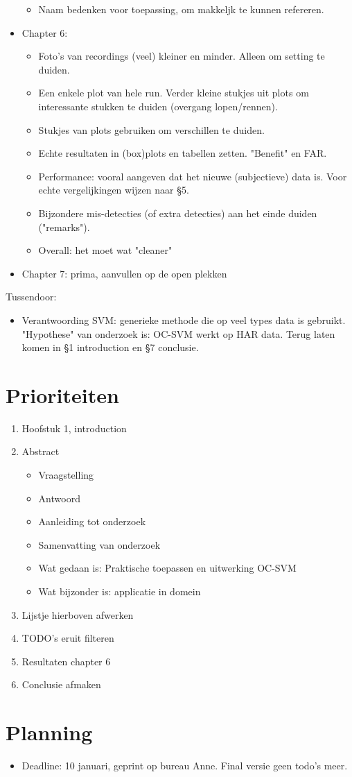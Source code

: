 \begin{itemize}
\begin{itemize}
    \item Naam bedenken voor toepassing, om makkeljk te kunnen refereren.
  \end{itemize}
  \item Chapter 6:
  \begin{itemize}
    \item Foto's van recordings (veel) kleiner en minder. Alleen om setting te duiden.
    \item Een enkele plot van hele run. Verder kleine stukjes uit plots om interessante stukken te duiden (overgang lopen/rennen).
    \item Stukjes van plots gebruiken om verschillen te duiden.
    \item Echte resultaten in (box)plots en tabellen zetten. "Benefit" en FAR.
    \item Performance: vooral aangeven dat het nieuwe (subjectieve) data is. Voor echte vergelijkingen wijzen naar §5.
    \item Bijzondere mis-detecties (of extra detecties) aan het einde duiden ("remarks").
    \item Overall: het moet wat "cleaner"
  \end{itemize}
  \item Chapter 7: prima, aanvullen op de open plekken
\end{itemize}

Tussendoor:
\begin{itemize}
  \item Verantwoording SVM: generieke methode die op veel types data is gebruikt. "Hypothese" van onderzoek is: OC-SVM werkt op HAR data. Terug laten komen in §1 introduction en §7 conclusie.
\end{itemize}

\section{Prioriteiten}
\begin{enumerate}
  \item Hoofstuk 1, introduction
  \item Abstract
  \begin{itemize}
    \item Vraagstelling
    \item Antwoord
    \item Aanleiding tot onderzoek
    \item Samenvatting van onderzoek
    \item Wat gedaan is: Praktische toepassen en uitwerking OC-SVM
    \item Wat bijzonder is: applicatie in domein
  \end{itemize}
  \item Lijstje hierboven afwerken
  \item TODO's eruit filteren
  \item Resultaten chapter 6
  \item Conclusie afmaken
\end{enumerate}

\section{Planning}
\begin{itemize}
  \item Deadline: 10 januari, geprint op bureau Anne. Final versie geen todo's meer.
\end{itemize}